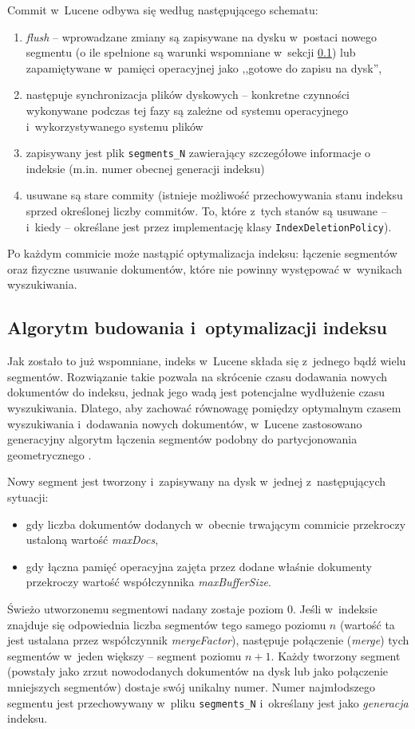 Commit w~Lucene odbywa się według następującego schematu:
\begin{enumerate}
 \item \emph{flush} -- wprowadzane zmiany są zapisywane na dysku w~postaci nowego segmentu (o ile spełnione są warunki wspomniane w~sekcji \ref{sec:segments}) lub zapamiętywane w~pamięci operacyjnej jako ,,gotowe do zapisu na dysk'',
 \item następuje synchronizacja plików dyskowych -- konkretne czynności wykonywane podczas tej fazy są zależne od systemu operacyjnego i~wykorzystywanego systemu plików
 \item zapisywany jest plik \texttt{segments\_N} zawierający szczegółowe informacje o indeksie (m.in. numer obecnej generacji indeksu)
 \item usuwane są stare commity (istnieje możliwość przechowywania stanu indeksu sprzed określonej liczby commitów. To, które z~tych stanów są usuwane -- i~kiedy -- określane jest przez implementację klasy \texttt{IndexDeletionPolicy}).
\end{enumerate}

Po każdym commicie może nastąpić optymalizacja indeksu: łączenie segmentów oraz fizyczne usuwanie dokumentów, które nie powinny występować w~wynikach wyszukiwania.

\subsection{Algorytm budowania i~optymalizacji indeksu}
\label{sec:segments}

Jak zostało to już wspomniane, indeks w~Lucene składa się z~jednego bądź wielu segmentów. Rozwiązanie takie pozwala na skrócenie czasu dodawania nowych dokumentów do indeksu, jednak jego wadą jest potencjalne wydłużenie czasu wyszukiwania. Dlatego, aby zachować równowagę pomiędzy optymalnym czasem wyszukiwania i~dodawania nowych dokumentów, w~Lucene zastosowano generacyjny algorytm łączenia segmentów podobny do partycjonowania geometrycznego \cite{geopart}. 

Nowy segment jest tworzony i~zapisywany na dysk w~jednej z~następujących sytuacji:
\begin{itemize}
 \item gdy liczba dokumentów dodanych w~obecnie trwającym commicie przekroczy ustaloną wartość \emph{maxDocs},
 \item gdy łączna pamięć operacyjna zajęta przez dodane właśnie dokumenty przekroczy wartość współczynnika \emph{maxBufferSize}.
\end{itemize}
Świeżo utworzonemu segmentowi nadany zostaje poziom 0. Jeśli w~indeksie znajduje się odpowiednia liczba segmentów tego samego poziomu $n$ (wartość ta jest ustalana przez współczynnik \emph{mergeFactor}), następuje połączenie (\emph{merge}) tych segmentów w~jeden większy -- segment poziomu $n+1$. Każdy tworzony segment (powstały jako zrzut nowododanych dokumentów na dysk lub jako połączenie mniejszych segmentów) dostaje swój unikalny numer. Numer najmłodszego segmentu jest przechowywany w~pliku \texttt{segments\_N} i~określany jest jako \emph{generacja} indeksu.

